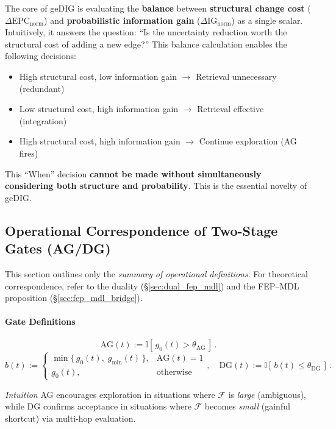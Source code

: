 \documentclass[12pt]{article}
\newcommand{\F}{\mathcal{F}}
\newcommand{\gednorm}{\Delta\mathrm{EPC}_{\mathrm{norm}}}
\newcommand{\ignorm}{\Delta\mathrm{IG}_{\mathrm{norm}}}
\begin{document}
The core of geDIG is evaluating the \textbf{balance} between \textbf{structural change cost} ($\gednorm$) and \textbf{probabilistic information gain} ($\ignorm$) as a single scalar.
Intuitively, it answers the question: ``Is the uncertainty reduction worth the structural cost of adding a new edge?''
This balance calculation enables the following decisions:
\begin{itemize}[leftmargin=1.6em]
    \item High structural cost, low information gain $\to$ Retrieval unnecessary (redundant)
    \item Low structural cost, high information gain $\to$ Retrieval effective (integration)
    \item High structural cost, high information gain $\to$ Continue exploration (AG fires)
\end{itemize}
This ``When'' decision \textbf{cannot be made without simultaneously considering both structure and probability}.
This is the essential novelty of geDIG.

\subsection{Operational Correspondence of Two-Stage Gates (AG/DG)}
\label{sec:ag_dg_gate}

This section outlines only the \emph{summary of operational definitions}. For theoretical correspondence, refer to the duality (\S\ref{sec:dual_fep_mdl}) and the FEP--MDL proposition (\S\ref{sec:fep_mdl_bridge}).

\paragraph{Gate Definitions}
\begin{equation}
  \mathrm{AG}(t) := \mathbb{I}[\, g_0(t) > \theta_{\mathrm{AG}}\,] \,.
  \label{eq:ag_trigger}
\end{equation}
\begin{equation}
  b(t) := \begin{cases}
    \min\{\, g_0(t),\; g_{\min}(t)\,\}, & \mathrm{AG}(t)=1\\
    g_0(t), & \mathrm{otherwise}
  \end{cases},\quad
  \mathrm{DG}(t) := \mathbb{I}[\, b(t) \le \theta_{\mathrm{DG}}\,] \,.
  \label{eq:dg_trigger}
\end{equation}

\noindent\textit{Intuition}\; AG encourages exploration in situations where $\F$ is \emph{large} (ambiguous), while DG confirms acceptance in situations where $\F$ becomes \emph{small} (gainful shortcut) via multi-hop evaluation.
\end{document}
